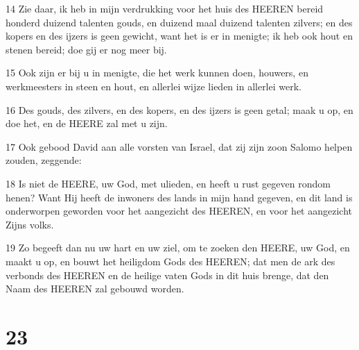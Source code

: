 \par 14 Zie daar, ik heb in mijn verdrukking voor het huis des HEEREN bereid honderd duizend talenten gouds, en duizend maal duizend talenten zilvers; en des kopers en des ijzers is geen gewicht, want het is er in menigte; ik heb ook hout en stenen bereid; doe gij er nog meer bij.
\par 15 Ook zijn er bij u in menigte, die het werk kunnen doen, houwers, en werkmeesters in steen en hout, en allerlei wijze lieden in allerlei werk.
\par 16 Des gouds, des zilvers, en des kopers, en des ijzers is geen getal; maak u op, en doe het, en de HEERE zal met u zijn.
\par 17 Ook gebood David aan alle vorsten van Israel, dat zij zijn zoon Salomo helpen zouden, zeggende:
\par 18 Is niet de HEERE, uw God, met ulieden, en heeft u rust gegeven rondom henen? Want Hij heeft de inwoners des lands in mijn hand gegeven, en dit land is onderworpen geworden voor het aangezicht des HEEREN, en voor het aangezicht Zijns volks.
\par 19 Zo begeeft dan nu uw hart en uw ziel, om te zoeken den HEERE, uw God, en maakt u op, en bouwt het heiligdom Gods des HEEREN; dat men de ark des verbonds des HEEREN en de heilige vaten Gods in dit huis brenge, dat den Naam des HEEREN zal gebouwd worden.

\chapter{23}

